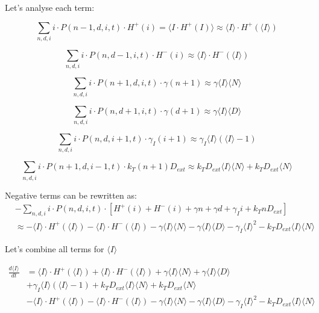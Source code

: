 \documentclass{article}
\begin{document}
\begin{flushleft}
Let's analyse each term:

\[
\sum_{n,d,i} i \cdot P(n-1,d,i,t) \cdot H^+(i) = \langle I \cdot H^+(I) \rangle \approx \langle I \rangle \cdot H^+(\langle I \rangle)
\]

\[
\sum_{n,d,i} i \cdot P(n,d-1,i,t) \cdot H^-(i) \approx \langle I \rangle \cdot H^-(\langle I \rangle)
\]

\[
\sum_{n,d,i} i \cdot P(n+1,d,i,t) \cdot \gamma(n+1) \approx \gamma \langle I \rangle \langle N \rangle
\]

\[
\sum_{n,d,i} i \cdot P(n,d+1,i,t) \cdot \gamma(d+1) \approx \gamma \langle I \rangle \langle D \rangle
\]

\[
\sum_{n,d,i} i \cdot P(n,d,i+1,t) \cdot \gamma_I(i+1) \approx \gamma_I \langle I \rangle (\langle I \rangle - 1)
\]

\[
\sum_{n,d,i} i \cdot P(n+1,d,i-1,t) \cdot k_T(n+1)D_{ext} \approx k_T D_{ext} \langle I \rangle \langle N \rangle + k_T D_{ext} \langle N \rangle
\]

Negative terms can be rewritten as:
\begin{align*}
&-\sum_{n,d,i} i \cdot P(n,d,i,t) \cdot [H^+(i) + H^-(i) + \gamma n + \gamma d + \gamma_I i + k_T n D_{ext}] \\
&\approx -\langle I \rangle \cdot H^+(\langle I \rangle) - \langle I \rangle \cdot H^-(\langle I \rangle) - \gamma \langle I \rangle \langle N \rangle - \gamma \langle I \rangle \langle D \rangle - \gamma_I \langle I \rangle^2 - k_T D_{ext} \langle I \rangle \langle N \rangle
\end{align*}

Let's combine all terms for $\langle I \rangle$

\begin{align*}
\frac{d\langle I \rangle}{dt} &= \langle I \rangle \cdot H^+(\langle I \rangle) + \langle I \rangle \cdot H^-(\langle I \rangle) + \gamma \langle I \rangle \langle N \rangle + \gamma \langle I \rangle \langle D \rangle \\
&+ \gamma_I \langle I \rangle (\langle I \rangle - 1) + k_T D_{ext} \langle I \rangle \langle N \rangle + k_T D_{ext} \langle N \rangle \\
&- \langle I \rangle \cdot H^+(\langle I \rangle) - \langle I \rangle \cdot H^-(\langle I \rangle) - \gamma \langle I \rangle \langle N \rangle - \gamma \langle I \rangle \langle D \rangle - \gamma_I \langle I \rangle^2 - k_T D_{ext} \langle I \rangle \langle N \rangle \\
\end{align*}


\end{flushleft}
\end{document}
